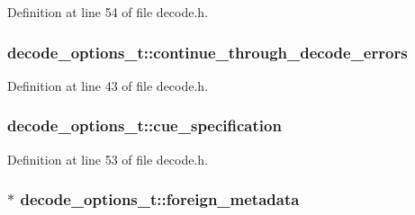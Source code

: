 Definition at line 54 of file decode.\+h.

\subsubsection[{\texorpdfstring{continue\+\_\+through\+\_\+decode\+\_\+errors}{continue_through_decode_errors}}]{ decode\+\_\+options\+\_\+t\+::continue\+\_\+through\+\_\+decode\+\_\+errors}\hypertarget{structdecode__options__t_a39ce3cd359230b6fde659bf224b5a5d8}{}\label{structdecode__options__t_a39ce3cd359230b6fde659bf224b5a5d8}


Definition at line 43 of file decode.\+h.

\subsubsection[{\texorpdfstring{cue\+\_\+specification}{cue_specification}}]{ decode\+\_\+options\+\_\+t\+::cue\+\_\+specification}\hypertarget{structdecode__options__t_a5e0da15d03fb6b717eb62ea41048d195}{}\label{structdecode__options__t_a5e0da15d03fb6b717eb62ea41048d195}


Definition at line 53 of file decode.\+h.

\subsubsection[{\texorpdfstring{foreign\+\_\+metadata}{foreign_metadata}}]{$\ast$ decode\+\_\+options\+\_\+t\+::foreign\+\_\+metadata}\hypertarget{structdecode__options__t_aef389aad459bdb64fe4dc2a3d232022d}{}\label{structdecode__options__t_aef389aad459bdb64fe4dc2a3d232022d}


